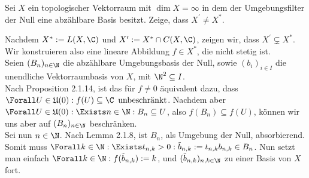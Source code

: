 \begin{exercise}

Sei $X$ ein topologischer Vektorraum mit $\dim{X} = \infty$ in dem der Umgebungsfilter der Null eine abzählbare Basis besitzt.
Zeige, dass $X^\prime \neq X^\ast$.

\end{exercise}

\begin{solution}

Nachdem $X^\ast := L(X, \C)$ und $X^\prime := X^\ast \cap C(X, \C)$, zeigen wir, dass $X^\prime \subsetneq X^\ast$.
Wir konstruieren also eine lineare Abbildung $f \in X^\ast$, die nicht stetig ist. \\

Seien $(B_n)_{n \in \N}$ die abzählbare Umgebungsbasis der Null, sowie $(b_i)_{i \in I}$ die unendliche Vektorraumbasis von $X$, mit $\N^2 \subseteq I$. \\

Nach Proposition 2.1.14, ist das für $f \neq 0$ äquivalent dazu, dass $\Forall U \in \mathfrak{U}(0): f(U) \subseteq \C \enspace \text{unbeschränkt}$.
Nachdem aber $\Forall U \in \mathfrak{U}(0): \Exists n \in \N: B_n \subseteq U$, also $f(B_n) \subseteq f(U)$, können wir uns aber auf $(B_n)_{n \in \N}$ beschränken. \\

Sei nun $n \in \N$.
Nach Lemma 2.1.8, ist $B_n$, als Umgebung der Null, absorbierend.
Somit muss $\Forall k \in \N: \Exists t_{n,k} > 0: \tilde{b}_{n,k} := t_{n,k} b_{n,k} \in B_n$.
Nun setzt man einfach $\Forall k \in \N: f(\tilde{b}_{n,k}) := k$, und $(\tilde{b}_{n,k})_{n,k \in \N}$ zu einer Basis von $X$ fort.

\end{solution}
